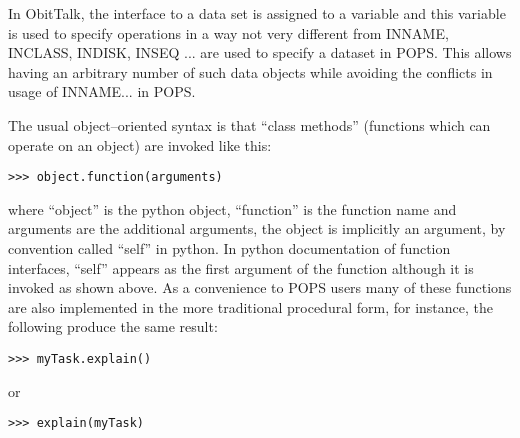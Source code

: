 \documentclass[11pt]{report}
\begin{document}
In ObitTalk, the interface to a  data set is assigned to a variable and
this variable is used to specify operations in a way not very
different from INNAME, INCLASS, INDISK, INSEQ ... are used to specify
a dataset in POPS.
This allows having an arbitrary number of such data objects while
avoiding the conflicts in usage of INNAME... in POPS.

The usual object--oriented syntax is that ``class methods'' (functions
which can operate on an object)  are invoked like this:
\begin{verbatim}
>>> object.function(arguments)
\end{verbatim}
where ``object'' is the python object, ``function'' is the function
name and arguments are the additional arguments, the object is
implicitly an argument, by convention called ``self'' in python.
In python documentation of function interfaces, ``self'' appears as the
first argument of the function although it is invoked as shown above.
As a convenience to POPS users many of these functions are also
implemented in the more traditional procedural form, for instance, the
following produce the same result:
\begin{verbatim}
>>> myTask.explain()
\end{verbatim}
or
\begin{verbatim}
>>> explain(myTask)
\end{verbatim}
\end{document}
